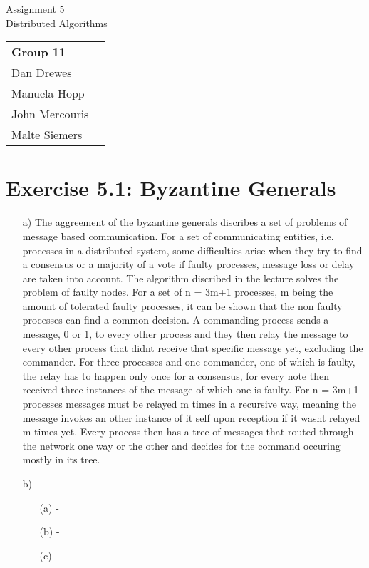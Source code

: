 \documentclass[12pt,a4paper]{article}
\begin{document}
\begin{center}
  \Large Assignment 5 \\
  \large Distributed Algorithms
\end{center}
\begin{flushright}
  \begin{tabular}{ll}
    \textbf{Group 11} \\
    Dan Drewes        \\ 
    Manuela Hopp      \\ 
    John Mercouris    \\
    Malte Siemers     \\
  \end{tabular} 
\end{flushright}



\section*{Exercise 5.1: Byzantine Generals}
\begin{enumerate}
\item[a)] The aggreement of the byzantine generals discribes a set of problems of message based communication. For a set of communicating entities, i.e. processes in a distributed system, some difficulties arise when they try to find a consensus or a majority of a vote if faulty processes, message loss or delay are taken into account. The algorithm discribed in the  lecture solves the problem of faulty nodes. For a set of n = 3m+1 processes, m being the amount of tolerated faulty processes, it can be shown that the non faulty processes can find a common decision. A commanding process sends a message, 0 or 1, to every other process and  they then relay the message to every other process that didnt receive that specific message yet, excluding the commander. For three processes and one commander, one of which is faulty, the relay has to happen only once for a consensus, for every note then received three instances of the message of which one is faulty. For n = 3m+1 processes messages must be relayed m times in a recursive way, meaning the message invokes an other instance of it self upon reception if it wasnt relayed m times yet. Every process then has a tree of messages that routed through the network one way or the other and decides for the command occuring mostly in its tree.
\item[b)]
  \begin{enumerate}
  \item[(a)] -
  \item[(b)] -
  \item[(c)] -
  \end{enumerate}
\end{enumerate}
\end{document}
